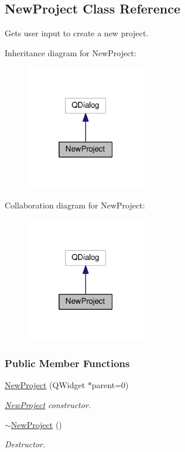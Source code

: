 \hypertarget{class_new_project}{}\subsection{New\+Project Class Reference}
\label{class_new_project}


Gets user input to create a new project.  




Inheritance diagram for New\+Project\+:
\nopagebreak
\begin{figure}[H]
\begin{center}
\leavevmode
\includegraphics[width=148pt]{class_new_project__inherit__graph}
\end{center}
\end{figure}


Collaboration diagram for New\+Project\+:
\nopagebreak
\begin{figure}[H]
\begin{center}
\leavevmode
\includegraphics[width=148pt]{class_new_project__coll__graph}
\end{center}
\end{figure}
\subsubsection*{Public Member Functions}
\begin{DoxyCompactItemize}
\item 
\hyperlink{group___window_ga011ff7a4c380f74bdafa4fdaed510c42}{New\+Project} (Q\+Widget $\ast$parent=0)
\begin{DoxyCompactList}\small\item\em \hyperlink{class_new_project}{New\+Project} constructor. \end{DoxyCompactList}\item 
\hyperlink{group___window_gae65155941598f4272f3df0b2f1428c78}{$\sim$\+New\+Project} ()
\begin{DoxyCompactList}\small\item\em Destructor. \end{DoxyCompactList}\end{DoxyCompactItemize}
